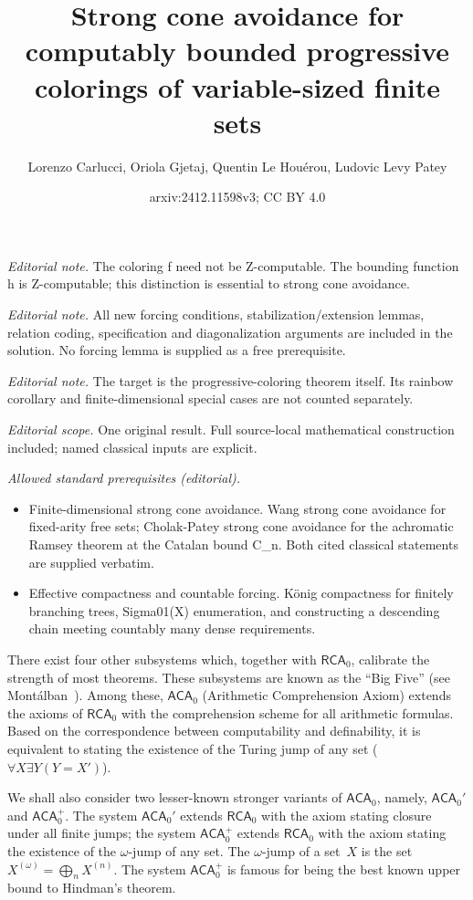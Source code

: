 \documentclass[10pt,a4paper]{article}
\title{Strong cone avoidance for computably bounded progressive colorings of variable-sized finite sets}
\author{Lorenzo Carlucci, Oriola Gjetaj, Quentin Le Houérou, Ludovic Levy Patey}
\date{arxiv:2412.11598v3; CC BY 4.0}
\newcommand{\RCA}[0]{\mathsf{RCA}}
\newcommand{\ACA}[0]{\mathsf{ACA}}
\def\qt#1{``#1''}%
\numberwithin{theorem}{section}
\begin{document}
\maketitle
\noindent\textit{Editorial note.} The coloring f need not be Z-computable. The bounding function h is Z-computable; this distinction is essential to strong cone avoidance.\par\medskip
\noindent\textit{Editorial note.} All new forcing conditions, stabilization/extension lemmas, relation coding, specification and diagonalization arguments are included in the solution. No forcing lemma is supplied as a free prerequisite.\par\medskip
\noindent\textit{Editorial note.} The target is the progressive-coloring theorem itself. Its rainbow corollary and finite-dimensional special cases are not counted separately.\par\medskip
\noindent\textit{Editorial scope.} One original result. Full source-local mathematical construction included; named classical inputs are explicit.\par\medskip
\noindent\textit{Allowed standard prerequisites (editorial).}\begin{itemize}
\item Finite-dimensional strong cone avoidance. Wang strong cone avoidance for fixed-arity free sets; Cholak-Patey strong cone avoidance for the achromatic Ramsey theorem at the Catalan bound C\_n. Both cited classical statements are supplied verbatim.
\item Effective compactness and countable forcing. König compactness for finitely branching trees, Sigma01(X) enumeration, and constructing a descending chain meeting countably many dense requirements.
\end{itemize}\medskip
There exist four other subsystems which, together with $\RCA_0$, calibrate the strength of most theorems. These subsystems are known as the \qt{Big Five} (see Mont\'alban~\cite{montalban_open_2011}). Among these, $\ACA_0$ (Arithmetic Comprehension Axiom) extends the axioms of $\RCA_0$ with the comprehension scheme for all arithmetic formulas. Based on the correspondence between computability and definability, it is equivalent to stating the existence of the Turing jump of any set ($\forall X \exists Y (Y = X')$).

We shall also consider two lesser-known stronger variants of $\ACA_0$, namely, $\ACA_0'$ and $\ACA_0^+$. The system $\ACA_0'$ extends $\RCA_0$ with the axiom stating closure under all finite jumps; the system $\ACA_0^+$ extends $\RCA_0$ with the axiom stating the existence of the $\omega$-jump of any set. The $\omega$-jump of a set~$X$ is the set $X^{(\omega)} = \bigoplus_n X^{(n)}$. The system $\ACA_0^+$ is famous for being the best known upper bound to Hindman's theorem.%
\end{document}
